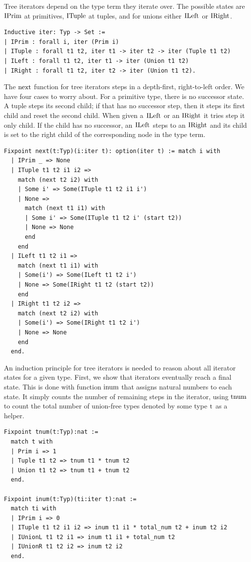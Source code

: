 \documentclass[a4paper,english]{lipics-v2019}
\renewcommand{\c}[1]{\ensuremath{\text{\lstinline{#1}}}\xspace}
\begin{document}
Tree iterators depend on the type term they iterate over. The possible
states are \c{IPrim} at primitives, \c{ITuple} at tuples, and for unions
either \c{ILeft} or \c{IRight}.

\begin{lstlisting}
Inductive iter: Typ -> Set :=
| IPrim : forall i, iter (Prim i)
| ITuple : forall t1 t2, iter t1 -> iter t2 -> iter (Tuple t1 t2)
| ILeft : forall t1 t2, iter t1 -> iter (Union t1 t2)
| IRight : forall t1 t2, iter t2 -> iter (Union t1 t2).
\end{lstlisting}

\noindent
The \c{next} function for tree iterators steps in a depth-first,
right-to-left order.  We have four cases to worry about. For a primitive
type, there is no successor state. A tuple steps its second child; if that
has no successor step, then it steps its first child and reset the second
child. When given a \c{ILeft} or an \c{IRight} it tries step it only
child. If the child has no successor, an \c{ILeft} steps to an \c{IRight}
and its child is set to the right child of the corresponding node in the
type term.

\begin{lstlisting}
Fixpoint next(t:Typ)(i:iter t): option(iter t) := match i with
  | IPrim _ => None
  | ITuple t1 t2 i1 i2 =>
    match (next t2 i2) with
    | Some i' => Some(ITuple t1 t2 i1 i')
    | None =>
      match (next t1 i1) with
      | Some i' => Some(ITuple t1 t2 i' (start t2))
      | None => None
      end
    end
  | ILeft t1 t2 i1 =>
    match (next t1 i1) with
    | Some(i') => Some(ILeft t1 t2 i')
    | None => Some(IRight t1 t2 (start t2))
    end
  | IRight t1 t2 i2 => 
    match (next t2 i2) with
    | Some(i') => Some(IRight t1 t2 i')
    | None => None
    end
  end.
\end{lstlisting}

\noindent
An induction principle for tree iterators is needed to reason about all
iterator states for a given type. First, we show that iterators eventually
reach a final state. This is done with function \c{inum} that assigns
natural numbers to each state. It simply counts the number of remaining
steps in the iterator, using \c{tnum} to count the total number of
union-free types denoted by some type \c{t} as a helper.

\newpage

\begin{lstlisting}
Fixpoint tnum(t:Typ):nat :=
  match t with
  | Prim i => 1
  | Tuple t1 t2 => tnum t1 * tnum t2
  | Union t1 t2 => tnum t1 + tnum t2
  end.

Fixpoint inum(t:Typ)(ti:iter t):nat :=
  match ti with
  | IPrim i => 0
  | ITuple t1 t2 i1 i2 => inum t1 i1 * total_num t2 + inum t2 i2
  | IUnionL t1 t2 i1 => inum t1 i1 + total_num t2
  | IUnionR t1 t2 i2 => inum t2 i2
  end.
\end{lstlisting}
\end{document}
